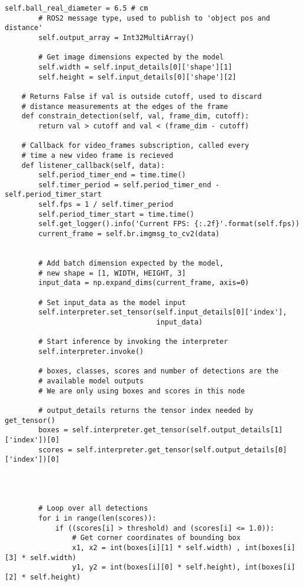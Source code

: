 \begin{lstlisting}[language=PythonPlus, basicstyle=\tiny,]
        self.ball_real_diameter = 6.5 # cm
        # ROS2 message type, used to publish to 'object pos and distance'
        self.output_array = Int32MultiArray()

        # Get image dimensions expected by the model
        self.width = self.input_details[0]['shape'][1]
        self.height = self.input_details[0]['shape'][2]
        
    # Returns False if val is outside cutoff, used to discard
    # distance measurements at the edges of the frame
    def constrain_detection(self, val, frame_dim, cutoff):
        return val > cutoff and val < (frame_dim - cutoff)
    
    # Callback for video_frames subscription, called every 
    # time a new video frame is recieved
    def listener_callback(self, data):
        self.period_timer_end = time.time()
        self.timer_period = self.period_timer_end - self.period_timer_start
        self.fps = 1 / self.timer_period
        self.period_timer_start = time.time()
        self.get_logger().info('Current FPS: {:.2f}'.format(self.fps))
        current_frame = self.br.imgmsg_to_cv2(data)

        
        # Add batch dimension expected by the model,
        # new shape = [1, WIDTH, HEIGHT, 3]
        input_data = np.expand_dims(current_frame, axis=0)

        # Set input_data as the model input
        self.interpreter.set_tensor(self.input_details[0]['index'],
                                    input_data)
        
        # Start inference by invoking the interpreter
        self.interpreter.invoke()

        # boxes, classes, scores and number of detections are the
        # available model outputs
        # We are only using boxes and scores in this node
        
        # output_details returns the tensor index needed by get_tensor()
        boxes = self.interpreter.get_tensor(self.output_details[1]['index'])[0]
        scores = self.interpreter.get_tensor(self.output_details[0]['index'])[0]




        # Loop over all detections
        for i in range(len(scores)):
            if ((scores[i] > threshold) and (scores[i] <= 1.0)):
                # Get corner coordinates of bounding box
                x1, x2 = int(boxes[i][1] * self.width) , int(boxes[i][3] * self.width)
                y1, y2 = int(boxes[i][0] * self.height), int(boxes[i][2] * self.height)


\end{lstlisting}

